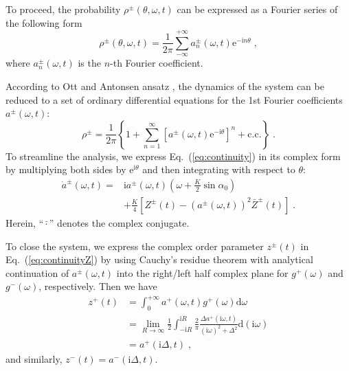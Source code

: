 \documentclass{article}
\begin{document}
To proceed, the probability $\rho ^{\pm}\left( \theta ,\omega ,t \right)$ can be expressed as a Fourier series of the following form
\begin{equation}
    \rho ^{\pm}\left( \theta ,\omega ,t \right) =\frac{1}{2\pi}\sum_{-\infty}^{+\infty}{a^{\pm} _n\left( \omega ,t \right) \mathrm{e}^{-\mathrm{i}n\theta}}\;,
\end{equation}
where $a^{\pm} _n\left( \omega ,t \right)$ is the $n$-th Fourier coefficient.

According to Ott and Antonsen ansatz \cite{10.1063/1.2930766, 10.1063/1.3136851}, the dynamics of the system can be reduced to a set of ordinary differential equations for the 1st Fourier coefficients $a^{\pm}\left( \omega ,t \right)$:
\begin{equation}
    \rho ^{\pm}=\frac{1}{2\pi}\left\{ 1+\sum_{n=1}^{\infty}{\left[ a^{\pm} \left( \omega ,t \right) \mathrm{e}^{-\mathrm{i}\theta} \right] ^n+\mathrm{c}.\mathrm{c}.} \right\} \;.
\end{equation}
To streamline the analysis, we express Eq.~(\ref{eq:continuity}) in its complex form by multiplying both sides by $\mathrm{e}^{\mathrm{i}\theta}$ and then integrating with respect to $\theta$:
\begin{equation}
    \label{eq:aDynamics}
    \begin{aligned}
        \dot{a}^{\pm}\left( \omega ,t \right) =&\mathrm{i}a^{\pm}\left( \omega ,t \right) \left( \omega +\frac{K}{2}\sin \alpha _0 \right)\\
        &+\frac{K}{4}\left[ Z^{\pm}\left( t \right) -\left( a^{\pm}\left( \omega ,t \right) \right) ^2\bar{Z}^{\pm}\left( t \right) \right] \;.
    \end{aligned}
\end{equation}
Herein, \enquote{$\bar{\cdot}$} denotes the complex conjugate.

To close the system, we express the complex order parameter $z^{\pm}\left( t \right)$ in Eq.~(\ref{eq:continuityZ}) by using Cauchy’s residue theorem with analytical continuation of $a^{\pm}\left( \omega ,t \right)$ into the right/left half complex plane for $g^{+}\left(\omega\right)$ and $g^{-}\left(\omega\right)$, respectively. Then we have
\begin{equation}
    \label{eq:zEqs2a}
    \begin{aligned}
        z^+\left( t \right) &=\int_0^{+\infty}{a^+\left( \omega ,t \right) g^+\left( \omega \right) \mathrm{d}\omega}\\
        &=\lim_{R\rightarrow \infty} \frac{1}{2}\int_{-\mathrm{i}R}^{\mathrm{i}R}{\frac{2}{\pi}\frac{\Delta a^+\left( \mathrm{i}\omega ,t \right)}{\left( \mathrm{i}\omega \right) ^2+\Delta ^2}\mathrm{d}\left( \mathrm{i}\omega \right)}\\
        &=a^+\left( \mathrm{i}\Delta ,t \right) \;,
    \end{aligned}
\end{equation}
and similarly, $z^-\left( t \right)=a^-\left( \mathrm{i}\Delta ,t \right)$.
\end{document}
